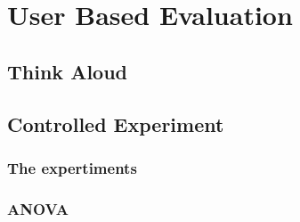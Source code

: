 \section{User Based Evaluation}
	\subsection{Think Aloud}
	\subsection{Controlled Experiment}
		\subsubsection{The expertiments}
		\subsubsection{ANOVA}
